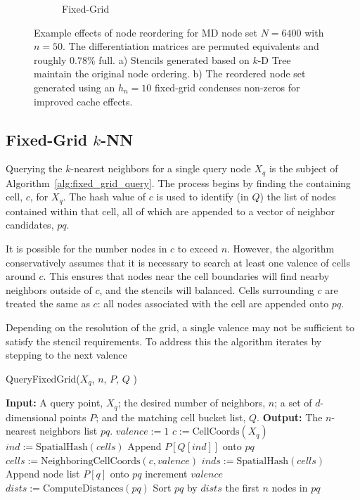 \documentclass{report}
\begin{document}
\begin{figure}
\begin{subfigure}{0.425\textwidth}
\caption{Fixed-Grid}
\end{subfigure}
\caption{Example effects of node reordering for MD node set $N=6400$ with $n=50$. The differentiation matrices are permuted equivalents and roughly $0.78\%$ full. a) Stencils generated based on $k$-D Tree maintain the original node ordering. b) The reordered node set generated using an $h_n=10$ fixed-grid condenses non-zeros for improved cache effects.}
\label{fig:reorder_example}
\end{figure} 

\subsection{Fixed-Grid $k$-NN}

Querying the $k$-nearest neighbors for a single query node $X_q$ is the subject of Algorithm~\ref{alg:fixed_grid_query}. The process begins by finding the containing cell, $c$, for $X_q$. The hash value of $c$ is used to identify (in $Q$) the list of nodes contained within that cell, all of which are appended to a vector of neighbor candidates, $pq$. 

It is possible for the number nodes in $c$ to exceed $n$. However, the algorithm conservatively assumes that it is necessary to search at least one valence of cells around $c$. This ensures that nodes near the cell boundaries will find nearby neighbors outside of $c$, and the stencils will balanced. Cells surrounding $c$ are treated the same as $c$: all nodes associated with the cell are appended onto $pq$. 

Depending on the resolution of the grid, a single valence may not be sufficient to satisfy the stencil requirements. To address this the algorithm iterates by stepping to the next valence  

\begin{algorithm} 
\caption{QueryFixedGrid($X_q$, $n$, $P$, $Q$ )}         
\label{alg:fixed_grid_query}  
\begin{algorithmic}[1]    
    \State \textbf{Input:} A query point, $X_q$; the desired number of neighbors, $n$; a set of $d$-dimensional points $P$; and the matching cell bucket list, $Q$.
    \State \textbf{Output:} The $n$-nearest neighbors list $pq$.
    \State     
    \State $valence := 1$
    \State $c := \text{CellCoords}(X_q)$ 
    \State $ind := \text{SpatialHash}(cells)$
    \State Append $P[Q[ind]]$ onto $pq$
        \State $cells := \text{NeighboringCellCoords}(c, valence)$
        \State $inds := \text{SpatialHash}(cells)$
            \State Append node list $P[q]$ onto $pq$
            \EndIf
        \EndFor
        \State increment $valence$
    \EndWhile
    \State $dists := \text{ComputeDistances}(pq)$
    \State Sort $pq$ by $dists$
    \State \Return the first $n$ nodes in $pq$
    \end{algorithmic}
\end{algorithm}
\end{document}
